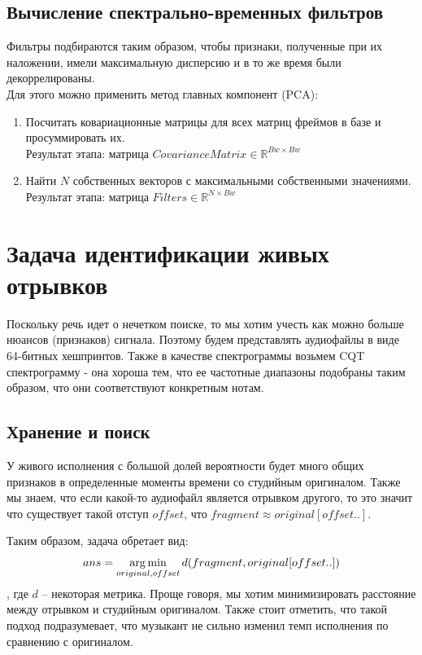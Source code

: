 \subsection{Вычисление спектрально-временных фильтров}
Фильтры подбираются таким образом, чтобы признаки, полученные при их наложении,
имели максимальную дисперсию и в то же время были декоррелированы.\\
Для этого можно применить метод главных компонент (PCA):
\begin{enumerate}[label=\arabic*.]
    \item Посчитать ковариационные матрицы для всех матриц фреймов в базе
    и просуммировать их.\\
    Результат этапа: матрица $CovarianceMatrix \in \mathbb{R}^{Bw \times Bw}$
    \item Найти $N$ собственных векторов с максимальными собственными значениями.\\
    Результат этапа: матрица $Filters \in \mathbb{R}^{N \times Bw}$
\end{enumerate}

\section{Задача идентификации живых отрывков}
Поскольку речь идет о нечетком поиске, то мы хотим учесть как можно
больше нюансов (признаков) сигнала. Поэтому будем представлять аудиофайлы в виде
64-битных хешпринтов. Также в качестве спектрограммы возьмем CQT спектрограмму -
она хороша тем, что ее частотные диапазоны подобраны таким образом, что они
соответствуют конкретным нотам.

\subsection{Хранение и поиск}
У живого исполнения с большой долей вероятности будет много общих признаков
в определенные моменты времени со студийным оригиналом. Также мы знаем, что
если какой-то аудиофайл является отрывком другого, то это значит что существует
такой отступ $offset$, что $fragment \approx original[offset..]$.

Таким образом, задача обретает вид:
$$ans = \operatorname*{arg\,min}_{original, offset}d(fragment, original[offset..])$$,
где $d$ -- некоторая метрика. Проще говоря, мы хотим минимизировать расстояние между
отрывком и студийным оригиналом. Также стоит отметить, что такой подход подразумевает,
что музыкант не сильно изменил темп исполнения по сравнению с оригиналом.

